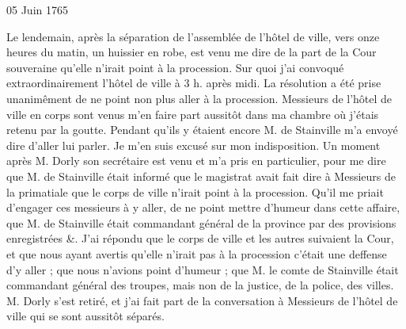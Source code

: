                      \begin{diary}{05 Juin 1765}{}

                         Le lendemain, après la séparation de
                           l'assemblée
                           de l'hôtel de ville, vers onze
                           heures du matin, un
                           huissier en robe, est venu me dire de la part de
                           la Cour souveraine qu'elle
                           n'irait point à la
                           procession. Sur quoi j'ai convoqué extraordinairement
                           l'hôtel de ville à 3 h. après midi. La résolution a été prise unanimêment de ne point non plus
                           aller à la procession. Messieurs de l'hôtel
                              de ville
                           en corps sont venus m'en faire part aussitôt
                           dans ma chambre où j'étais retenu par la goutte.
                           Pendant qu'ils y étaient encore M.
                              de Stainville
                           m'a envoyé dire d'aller lui parler. Je m'en suis
                           excusé sur mon indisposition. Un moment après
                           M. Dorly son secrétaire est
                           venu et m'a pris
                           en particulier, pour me dire que M. de
                              Stainville
                           était informé que le magistrat avait fait dire
                           à Messieurs de la primatiale que le corps de ville
                           n'irait point à la procession. Qu'il me priait
                           d'engager ces messieurs à y aller, de ne point
                           mettre d'humeur dans cette affaire, que M. de
                              Stainville était commandant général de la
                           province
                           par des provisions enregistrées \&. J'ai répondu
                           que le corps de ville et
                           les autres suivaient la
                           Cour, et que nous ayant avertis qu'elle n'irait
                           pas à la procession c'était une deffense d'y aller ;
                           que nous n'avions point d'humeur ; que M. le
                              comte de Stainville était commandant
                           général des
                           troupes, mais non de la justice, de la police,
                           des villes. M. Dorly s'est retiré,
                           et j'ai fait
                           part de la conversation à Messieurs de l'hôtel de ville
                           qui se sont aussitôt séparés. \bigskip




\end{diary}
